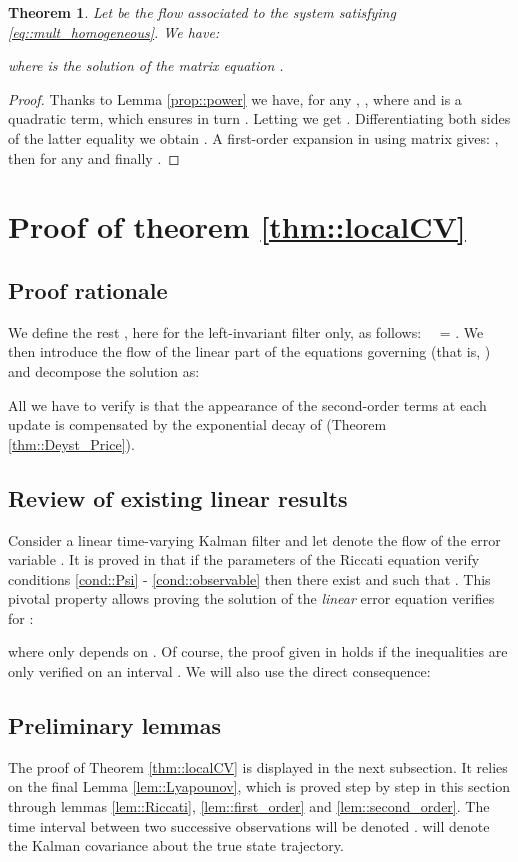 \documentclass[a4paper,12pt,onecolumn]{article}
\newtheorem{thm}{Theorem}
\begin{document}
\begin{thm}
\label{thm::exp}
Let  be the flow associated to the system  satisfying \eqref{eq::mult_homogeneous}.
We have:
\color{black}

where  is the solution of the matrix equation  \color{black}.
\end{thm}
 \begin{proof}
Thanks to Lemma \ref{prop::power} we have, for any , , where  and  is a quadratic term, which ensures in turn .  
Letting  we get . Differentiating both sides of the latter equality we obtain . A first-order expansion in  using matrix  gives: , then  for any  and finally .
\color{black}
\end{proof}


\section{Proof of theorem \ref{thm::localCV}}
\label{proof::localCV}




\subsection{Proof rationale}
We define the rest , here for the left-invariant filter only, as follows:     ~~= . We then introduce the flow  of the linear part  of the equations governing  (that is, ) and decompose the solution  as:

All we have to verify is that the appearance of the second-order terms  at each update is compensated by the exponential decay of  (Theorem \ref{thm::Deyst_Price}).
\subsection{Review of existing linear results}

Consider a linear time-varying Kalman filter and let  denote the flow of the error variable . It is proved in \cite{deyst} that if the parameters of the Riccati equation verify conditions \eqref{cond::Psi} - \eqref{cond::observable} then there exist  and  such that . This pivotal property allows proving the solution of the \emph{linear} error equation  verifies for :

where  only depends on . Of course, the proof given in \cite{deyst} holds if the inequalities are only verified on an interval . We will also use the  direct consequence:


\subsection{Preliminary lemmas}
The proof of Theorem \ref{thm::localCV} is displayed in the next subsection. It relies on the final Lemma \ref{lem::Lyapounov}, which is proved step by step in this section through lemmas \ref{lem::Riccati}, \ref{lem::first_order} and \ref{lem::second_order}. The time  interval between two successive observations will be denoted .  will denote the Kalman covariance about the true state trajectory.
\end{document}
